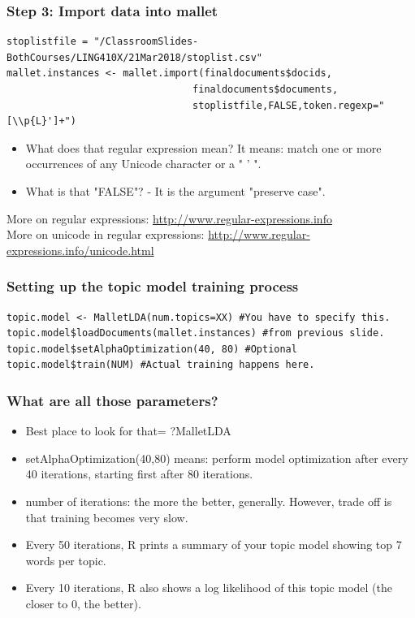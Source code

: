 \documentclass{beamer}
\begin{document}
\begin{frame}[fragile]
\frametitle{Step 3: Import data into mallet}
\scriptsize
\begin{verbatim}
stoplistfile = "/ClassroomSlides-BothCourses/LING410X/21Mar2018/stoplist.csv"
mallet.instances <- mallet.import(finaldocuments$docids,
                                finaldocuments$documents,
                                stoplistfile,FALSE,token.regexp="[\\p{L}']+")
\end{verbatim}
\normalsize
\begin{itemize}
\item What does that regular expression mean? \pause It means: match one or more occurrences of any Unicode character or a " ' ". 
\item What is that "FALSE"? \pause - It is the argument "preserve case".
\end{itemize}

More on regular expressions: \url{http://www.regular-expressions.info} \\
More on unicode in regular expressions: \url{http://www.regular-expressions.info/unicode.html}
\end{frame}

\begin{frame}[fragile]
\frametitle{Setting up the topic model training process}
\footnotesize
\begin{verbatim}
topic.model <- MalletLDA(num.topics=XX) #You have to specify this.
topic.model$loadDocuments(mallet.instances) #from previous slide. 
topic.model$setAlphaOptimization(40, 80) #Optional
topic.model$train(NUM) #Actual training happens here.
\end{verbatim}
\end{frame}

\begin{frame}
\frametitle{What are all those parameters?}
\begin{itemize}
\item Best place to look for that= ?MalletLDA 
\item setAlphaOptimization(40,80) means: perform model optimization after every 40 iterations, starting first after 80 iterations. 
\item number of iterations: the more the better, generally. However, trade off is that training becomes very slow. 
\item Every 50 iterations, R prints a summary of your topic model showing top 7 words per topic. 
\item Every 10 iterations, R also shows a log likelihood of this topic model (the closer to 0, the better).
\end{itemize}
\end{frame}
\end{document}

